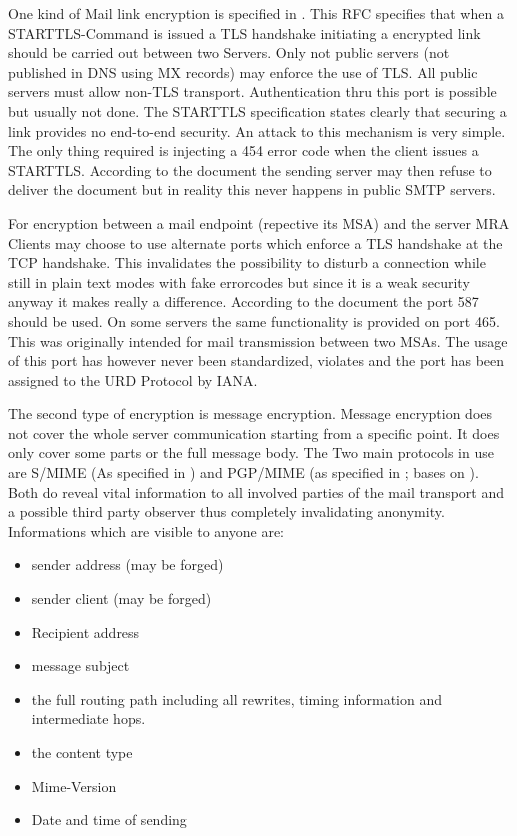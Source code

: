 One kind of Mail link encryption is specified in \cite{RFC3207}. This RFC specifies that when a STARTTLS-Command is issued a TLS handshake initiating a encrypted link should be carried out between two Servers. Only not public servers (not published in DNS using MX records) may enforce the use of TLS. All public servers must allow non-TLS transport. Authentication thru this port is possible but usually not done. The STARTTLS specification states clearly that securing a link provides no end-to-end security. An attack to this mechanism is very simple. The only thing required is injecting a 454 error code when the client issues a STARTTLS. According to the document the sending server may then refuse to deliver the document but in reality this never happens in public SMTP servers.\par

For encryption between a mail endpoint (repective its MSA)  and the server MRA Clients may choose to use alternate ports which enforce a TLS handshake at the TCP handshake. This invalidates the possibility to disturb a connection while still in plain text modes with fake errorcodes but since it is a weak security anyway it makes really a difference. According to the \cite{RFC3207} document the port 587 should be used. On some servers the same functionality is provided on port 465. This was originally intended for mail transmission between two MSAs. The usage of this port has however never been standardized, violates \cite{RFC6409} and the port has been assigned to the URD Protocol by IANA.\par

The second type of encryption is message encryption. Message encryption does not cover the whole server communication starting from a specific point. It does only cover some parts or the full message body. The Two main protocols in use are S/MIME (As specified in \cite{RFC2311}) and PGP/MIME (as specified in \cite {RFC2015}; bases on \cite{RFC1847}). Both do reveal vital information to all involved parties of the mail transport and a possible third party observer thus completely invalidating anonymity. Informations which are visible to anyone are: 

\begin{itemize}
\item sender address (may be forged)
\item sender client (may be forged)
\item Recipient address
\item message subject 
\item the full routing path including all rewrites, timing information and intermediate hops.
\item the content type
\item Mime-Version
\item Date and time of sending
\end{itemize}

